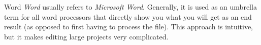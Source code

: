 \begin{definition}{Word} \textit{Word} usually refers to \textit{Microsoft Word}. Generally, it is used as an umbrella term for all word processors that directly show you what you will get as an end result (as opposed to first having to process the file). This approach is intuitive, but it makes editing large projects very complicated.\end{definition}